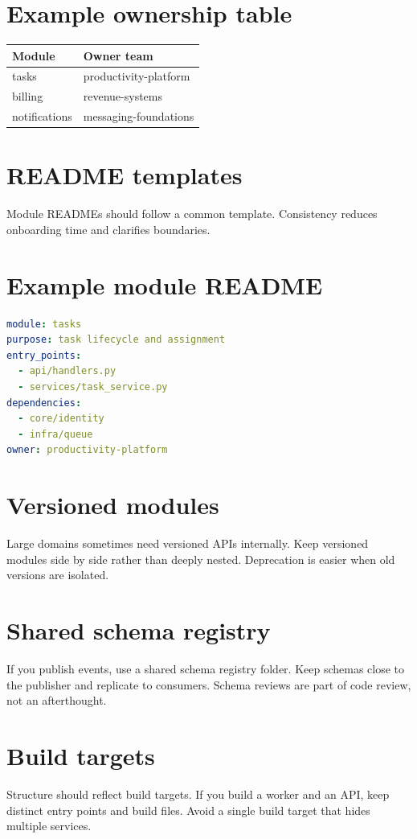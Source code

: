 \section{Example ownership table}
\begin{tabularx}{\textwidth}{@{}lX@{}}
\toprule
Module & Owner team \\
\midrule
tasks & productivity-platform \\
billing & revenue-systems \\
notifications & messaging-foundations \\
\bottomrule
\end{tabularx}

\section{README templates}
Module READMEs should follow a common template.
Consistency reduces onboarding time and clarifies boundaries.

\section{Example module README}
\begin{lstlisting}[language=YAML]
module: tasks
purpose: task lifecycle and assignment
entry_points:
  - api/handlers.py
  - services/task_service.py
dependencies:
  - core/identity
  - infra/queue
owner: productivity-platform
\end{lstlisting}

\section{Versioned modules}
Large domains sometimes need versioned APIs internally.
Keep versioned modules side by side rather than deeply nested.
Deprecation is easier when old versions are isolated.

\section{Shared schema registry}
If you publish events, use a shared schema registry folder.
Keep schemas close to the publisher and replicate to consumers.
Schema reviews are part of code review, not an afterthought.

\section{Build targets}
Structure should reflect build targets.
If you build a worker and an API, keep distinct entry points and build files.
Avoid a single build target that hides multiple services.


